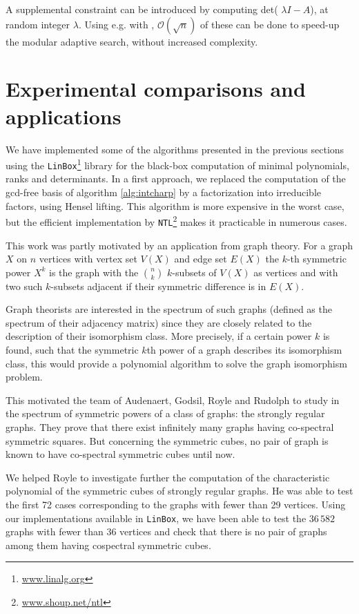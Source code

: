 \documentclass{article}
\newcommand{\GO}{\mathcal{ O}}
\begin{document}
A supplemental constraint can be introduced by 
computing det( $\lambda I - A$),
at random integer $\lambda$. 
Using e.g. \cite[Theorem 4.2]{jgd:2006:det} with \cite{Eberly:2006:sparse},
$\GO(\sqrt{n})$ of these 
can be done to speed-up the modular adaptive search,
without increased complexity.

\section{Experimental comparisons and applications}\label{sec:exp}

We have implemented some of the algorithms presented in the previous sections using the
\texttt{LinBox}\footnote{\url{www.linalg.org}} library for the black-box
computation of minimal polynomials, ranks and determinants.
In a first approach, we replaced the computation of the gcd-free basis of
algorithm \ref{alg:intcharp} by a factorization into irreducible factors, using
Hensel lifting. This algorithm is more expensive in the worst case, but the
efficient implementation by \texttt{NTL}\footnote{\url{www.shoup.net/ntl}} 
makes it practicable in numerous cases.

This work was partly motivated by an application from graph theory.
For a graph $X$ on $n$ vertices with vertex set $V(X)$ and edge set
$E(X)$ the $k$-th symmetric power $X^{k}$ is the graph with the
${n \choose k}$ $k$-subsets of $V(X)$ as vertices and with two such
$k$-subsets adjacent if their symmetric difference is in $E(X)$.

Graph theorists are interested in the spectrum of such graphs (defined as the
spectrum of their adjacency matrix) since they are closely related to the
description of their isomorphism class. 
More precisely, if a certain power $k$ is found, such that the symmetric $k$th 
power of a graph describes its isomorphism class, this would provide a polynomial
algorithm to solve the graph isomorphism problem. 

This motivated the team of Audenaert, Godsil, Royle and Rudolph to study in
\cite{Royle:2007:symm} the spectrum of  symmetric powers of a class of graphs:
the strongly regular graphs. They prove that there exist infinitely many graphs
having co-spectral symmetric squares. But concerning the symmetric cubes, no
pair of graph is known to have co-spectral symmetric cubes until now.

We helped Royle to investigate further the computation of the characteristic
polynomial of the symmetric cubes of strongly regular graphs. 
He was able to test the first 72 cases corresponding to the graphs with fewer
than 29 vertices. Using our implementations available in \texttt{LinBox}, we
have been able to test the $36\,582$  graphs with fewer than 36 vertices and
check that there is no pair of graphs among them having cospectral symmetric
cubes.
\end{document}
